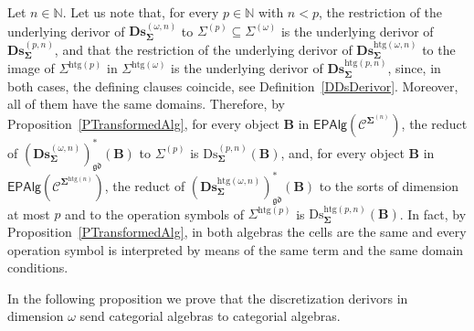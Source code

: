 \documentclass[a4paper, reqno]{amsbook}
\newcommand{\sig}[1]{\mathbf{#1}}             %
\newcommand{\spec}[1]{\boldsymbol{\mathcal{#1}}} %
\newcommand{\gd}{\mathfrak{gd}}              %
\newcommand{\htg}{\mathrm{htg}}                %
\newcommand{\Ds}{\mathrm{Ds}}
\newcommand{\bDs}{\mathbf{Ds}}
\theoremstyle{plain}
\theoremstyle{definition}
\begin{document}
Let $n\in\mathbb{N}$.
Let us note that, for every $p\in\mathbb{N}$ with $n<p$, the restriction of the underlying derivor of $\bDs^{(\omega,n)}_{\sig{\Sigma}}$ to $\Sigma^{(p)}\subseteq\Sigma^{(\omega)}$ is the underlying derivor of $\bDs^{(p,n)}_{\sig{\Sigma}}$, and that the restriction of the underlying derivor of $\bDs^{\htg(\omega,n)}_{\sig{\Sigma}}$ to the image of $\Sigma^{\htg(p)}$ in $\Sigma^{\htg(\omega)}$ is the underlying derivor of $\bDs^{\htg(p,n)}_{\sig{\Sigma}}$, since, in both cases, the defining clauses coincide, see Definition~\ref{DDsDerivor}.
Moreover, all of them have the same domains.
Therefore, by Proposition~\ref{PTransformedAlg}, for every object $\mathbf{B}$ in $\mathsf{EPAlg}(\spec{C}^{\sig{\Sigma}^{(n)}})$, the reduct of $(\bDs^{(\omega,n)}_{\sig{\Sigma}})^{\ast}_{\gd}(\mathbf{B})$ to $\Sigma^{(p)}$ is $\Ds^{(p,n)}_{\sig{\Sigma}}(\mathbf{B})$, and, for every object $\mathbf{B}$ in $\mathsf{EPAlg}(\spec{C}^{\sig{\Sigma}^{\htg(n)}})$, the reduct of $(\bDs^{\htg(\omega,n)}_{\sig{\Sigma}})^{\ast}_{\gd}(\mathbf{B})$ to the sorts of dimension at most $p$ and to the operation symbols of $\Sigma^{\htg(p)}$ is $\Ds^{\htg(p,n)}_{\sig{\Sigma}}(\mathbf{B})$.
In fact, by Proposition~\ref{PTransformedAlg}, in both algebras the cells are the same and every operation symbol is interpreted by means of the same term and the same domain conditions.

In the following proposition we prove that the discretization derivors in dimension $\omega$ send categorial algebras to categorial algebras.
\end{document}
